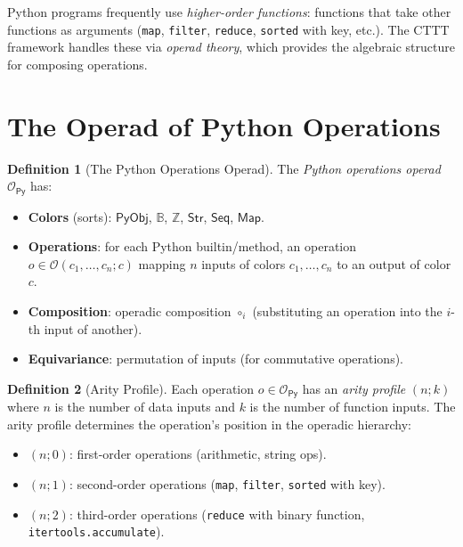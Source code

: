 \documentclass[11pt,a4paper]{report}
\theoremstyle{definition}
\newtheorem{definition}{Definition}[chapter]
\theoremstyle{plain}
\newcommand{\Int}{\mathbb{Z}}
\newcommand{\Bool}{\mathbb{B}}
\newcommand{\PyObj}{\mathsf{PyObj}}
\begin{document}
Python programs frequently use \emph{higher-order functions}:
functions that take other functions as arguments (\texttt{map},
\texttt{filter}, \texttt{reduce}, \texttt{sorted} with key, etc.).
The CTTT framework handles these via \emph{operad theory}, which
provides the algebraic structure for composing operations.

\section{The Operad of Python Operations}

\begin{definition}[The Python Operations Operad]
The \emph{Python operations operad} $\mathcal{O}_\mathsf{Py}$ has:
\begin{itemize}
  \item \textbf{Colors} (sorts): $\PyObj$, $\Bool$, $\Int$,
    $\mathsf{Str}$, $\mathsf{Seq}$, $\mathsf{Map}$.
  \item \textbf{Operations}: for each Python builtin/method, an
    operation $o \in \mathcal{O}(c_1, \ldots, c_n; c)$ mapping
    $n$ inputs of colors $c_1, \ldots, c_n$ to an output of color $c$.
  \item \textbf{Composition}: operadic composition $\circ_i$
    (substituting an operation into the $i$-th input of another).
  \item \textbf{Equivariance}: permutation of inputs (for
    commutative operations).
\end{itemize}
\end{definition}

\begin{definition}[Arity Profile]
\label{def:arity-profile}
Each operation $o \in \mathcal{O}_\mathsf{Py}$ has an \emph{arity
profile} $(n; k)$ where $n$ is the number of data inputs and $k$ is
the number of function inputs.  The arity profile determines the
operation's position in the operadic hierarchy:
\begin{itemize}
  \item $(n; 0)$: first-order operations (arithmetic, string ops).
  \item $(n; 1)$: second-order operations (\texttt{map}, \texttt{filter},
    \texttt{sorted} with key).
  \item $(n; 2)$: third-order operations (\texttt{reduce} with binary
    function, \texttt{itertools.accumulate}).
\end{itemize}
\end{definition}
\end{document}
